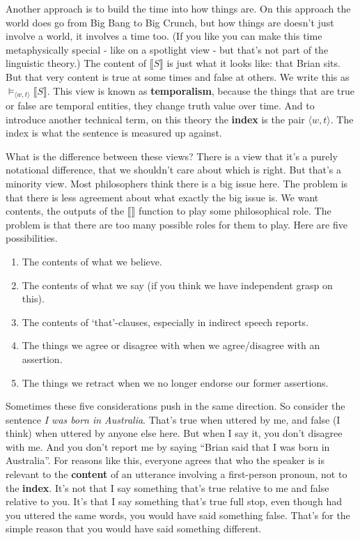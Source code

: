 \documentclass[
]{article}
\providecommand{\tightlist}{%
  \setlength{\itemsep}{0pt}\setlength{\parskip}{0pt}}
\begin{document}
Another approach is to build the time into how things are. On this
approach the world does go from Big Bang to Big Crunch, but how things
are doesn't just involve a world, it involves a time too. (If you like
you can make this time metaphysically special - like on a spotlight view
- but that's not part of the linguistic theory.) The content of \(⟦S⟧\)
is just what it looks like: that Brian sits. But that very content is
true at some times and false at others. We write this as
\(\vDash_{\langle w, t \rangle}⟦S⟧\). This view is known as
\textbf{temporalism}, because the things that are true or false are
temporal entities, they change truth value over time. And to introduce
another technical term, on this theory the \textbf{index} is the pair
\(\langle w, t \rangle\). The index is what the sentence is measured up
against.

What is the difference between these views? There is a view that it's a
purely notational difference, that we shouldn't care about which is
right. But that's a minority view. Most philosophers think there is a
big issue here. The problem is that there is less agreement about what
exactly the big issue is. We want contents, the outputs of the \(⟦⟧\)
function to play some philosophical role. The problem is that there are
too many possible roles for them to play. Here are five possibilities.

\begin{enumerate}
\def\labelenumi{\arabic{enumi}.}
\tightlist
\item
  The contents of what we believe.
\item
  The contents of what we say (if you think we have independent grasp on
  this).
\item
  The contents of `that'-clauses, especially in indirect speech reports.
\item
  The things we agree or disagree with when we agree/disagree with an
  assertion.
\item
  The things we retract when we no longer endorse our former assertions.
\end{enumerate}

Sometimes these five considerations push in the same direction. So
consider the sentence \emph{I was born in Australia}. That's true when
uttered by me, and false (I think) when uttered by anyone else here. But
when I say it, you don't disagree with me. And you don't report me by
saying ``Brian said that I was born in Australia''. For reasons like
this, everyone agrees that who the speaker is is relevant to the
\textbf{content} of an utterance involving a first-person pronoun, not
to the \textbf{index}. It's not that I say something that's true
relative to me and false relative to you. It's that I say something
that's true full stop, even though had you uttered the same words, you
would have said something false. That's for the simple reason that you
would have said something different.
\end{document}
